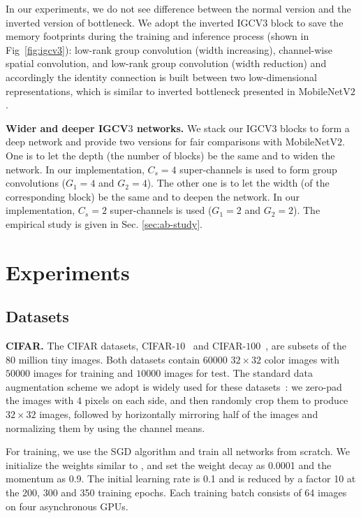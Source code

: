 \documentclass{bmvc2k}
\begin{document}
	In our experiments, we do not see difference between the normal version and the inverted version of bottleneck. We adopt the inverted IGCV$3$ block to save the memory footprints during the training and inference process (shown in Fig~\ref{fig:igcv3}):
	low-rank group convolution (width increasing),
	channel-wise spatial convolution,
	and low-rank group convolution (width reduction)
	and accordingly the identity connection is built between two low-dimensional representations, which is similar to inverted bottleneck presented in MobileNetV$2$ \cite{sandler2018inverted}.

	\noindent\textbf{Wider and deeper IGCV$3$ networks.}
	We stack our IGCV$3$ blocks to form a deep network and provide two versions for fair comparisons with MobileNetV$2$.
	One is to let the depth (the number of blocks) be the same and to
	widen the network. In our implementation,
	$C_s=4$ super-channels is used to form group convolutions ($G_1=4$ and $G_2=4$).
	The other one is to let the width (of the corresponding block) be the same
	and to deepen the network.
	In our implementation, $C_s = 2$ super-channels is used ($G_1=2$ and $G_2=2$).
	The empirical study is given in Sec. \ref{sec:ab-study}.

	\section{Experiments}
	\label{sec:exp}
	\subsection{Datasets}
	\noindent\textbf{CIFAR.}
	The CIFAR datasets, CIFAR-$10$~\cite{Cifar10} and CIFAR-$100$~\cite{Cifar100},
	are subsets of the $80$ million tiny images.
	Both datasets contain $60000$ $32\times32$ color images with $50000$ images for training and $10000$ images for test.
	The standard data augmentation scheme we adopt is widely used for these datasets~\cite{HeZRS16, LeeXGZT15, HuangLW16a, LarssonMS16a, LinCY13, RomeroBKCGB14, SpringenbergDBR14, SrivastavaGS15}: we zero-pad the images with $4$ pixels on each side, and then randomly crop them to produce $32\times32$ images, followed by horizontally mirroring half of the images and normalizing them by using the channel means.

	For training, we use the SGD algorithm and train all networks from scratch. We initialize the weights similar to \cite{HeZRS16, HeZRS16ECCV}, and set the weight decay as 0.0001 and the momentum as 0.9. The initial learning rate is 0.1 and is reduced by a factor 10 at the 200, 300 and 350 training epochs. Each training batch consists of 64 images on four asynchronous GPUs.
\end{document}

